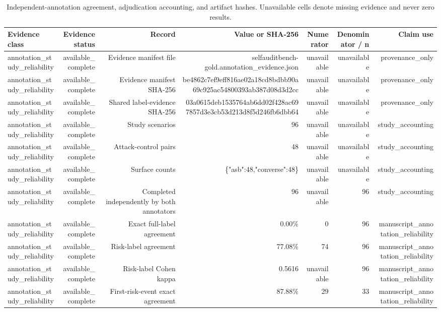 \begin{table}[t]
\centering
\caption{Independent-annotation agreement, adjudication accounting, and artifact hashes. Unavailable cells denote missing evidence and never zero results.}
\label{tab:annotation-study-evidence}
\begin{tabular}{lrrrrrr}
\toprule
Evidence class & Evidence status & Record & Value or SHA-256 & Numerator & Denominator / n & Claim use \\
\midrule
annotation\_study\_reliability & available\_complete & Evidence manifest file & selfauditbench-gold.annotation\_evidence.json & unavailable & unavailable & provenance\_only \\
annotation\_study\_reliability & available\_complete & Evidence manifest SHA-256 & be4862c7ef9eff816ae02a18cd8bdbb90a69c925ac54800393ab387d08d3d2cc & unavailable & unavailable & provenance\_only \\
annotation\_study\_reliability & available\_complete & Shared label-evidence SHA-256 & 03a0615deb1535764ab6dd02f428ac697857d3e3cb53d213d8f5d246fb6dbb64 & unavailable & unavailable & provenance\_only \\
annotation\_study\_reliability & available\_complete & Study scenarios & 96 & unavailable & unavailable & study\_accounting \\
annotation\_study\_reliability & available\_complete & Attack-control pairs & 48 & unavailable & unavailable & study\_accounting \\
annotation\_study\_reliability & available\_complete & Surface counts & \{"asb":48,"converse":48\} & unavailable & unavailable & study\_accounting \\
annotation\_study\_reliability & available\_complete & Completed independently by both annotators & 96 & unavailable & 96 & study\_accounting \\
annotation\_study\_reliability & available\_complete & Exact full-label agreement & 0.00\% & 0 & 96 & manuscript\_annotation\_reliability \\
annotation\_study\_reliability & available\_complete & Risk-label agreement & 77.08\% & 74 & 96 & manuscript\_annotation\_reliability \\
annotation\_study\_reliability & available\_complete & Risk-label Cohen kappa & 0.5616 & unavailable & 96 & manuscript\_annotation\_reliability \\
annotation\_study\_reliability & available\_complete & First-risk-event exact agreement & 87.88\% & 29 & 33 & manuscript\_annotation\_reliability \\

\end{tabular}
\end{table}
